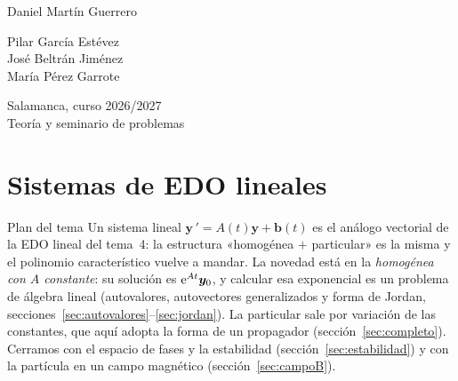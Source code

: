 \documentclass[11pt,twoside]{article}
\newcommand\vy{\bm{y}}
\newcommand\vb{\bm{b}}
\begin{document}
\begin{titlepage}
\begin{minipage}[t]{0.32\textwidth}
{\small Daniel Martín Guerrero}
\end{minipage}\hfill
\begin{minipage}[t]{0.32\textwidth}\centering
{\color{acc}\footnotesize{}}\par\vspace{2pt}
{\small Pilar García Estévez\\ José Beltrán Jiménez\\ María Pérez Garrote}
\end{minipage}\hfill
\begin{minipage}[t]{0.32\textwidth}\raggedleft
{\color{acc}\footnotesize{}}\par\vspace{2pt}
{\small Salamanca, curso 2026/2027}\\[1pt]
{\footnotesize\color{muted}Teoría y seminario de problemas}
\end{minipage}
\end{titlepage}

\setcounter{page}{2}
{\hypersetup{linkcolor=fg}\tableofcontents}
\clearpage

\section{Sistemas de EDO lineales}\label{sec:sistemas}

\begin{motivacion}{Plan del tema}
Un sistema lineal $\vy\,'=A(t)\vy+\vb(t)$ es el análogo vectorial de la EDO lineal del tema~4: la estructura
«homogénea $+$ particular» es la misma y el polinomio característico vuelve a mandar. La novedad está en la
\emph{homogénea con $A$ constante}: su solución es $\e^{At}\vy_0$, y calcular esa exponencial es un problema de
álgebra lineal (autovalores, autovectores generalizados y forma de Jordan, secciones~\ref{sec:autovalores}--\ref{sec:jordan}).
La particular sale por variación de las constantes, que aquí adopta la forma de un propagador
(sección~\ref{sec:completo}). Cerramos con el espacio de fases y la estabilidad (sección~\ref{sec:estabilidad}) y
con la partícula en un campo magnético (sección~\ref{sec:campoB}).
\end{motivacion}
\end{document}
